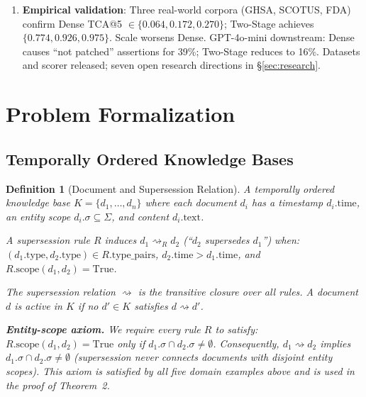 \documentclass[11pt]{article}
\newtheorem{definition}{Definition}
\begin{document}
\begin{enumerate}
  \item \textbf{Empirical validation}: Three real-world corpora (GHSA, SCOTUS, FDA) confirm Dense TCA@5 $\in \{0.064, 0.172, 0.270\}$; Two-Stage achieves $\{0.774, 0.926, 0.975\}$. Scale worsens Dense. GPT-4o-mini downstream: Dense causes ``not patched'' assertions for 39\%; Two-Stage reduces to 16\%. Datasets and scorer released; seven open research directions in \S\ref{sec:research}.
\end{enumerate}

\section{Problem Formalization}
\label{sec:problem}

\subsection{Temporally Ordered Knowledge Bases}

\begin{definition}[Document and Supersession Relation]
A \emph{temporally ordered knowledge base} $K = \{d_1, \ldots, d_n\}$ where each document $d_i$ has a timestamp $d_i.\text{time}$, an entity scope $d_i.\sigma \subseteq \Sigma$, and content $d_i.\text{text}$.

A \emph{supersession rule} $R$ induces $d_1 \rightsquigarrow_R d_2$ (``$d_2$ supersedes $d_1$'') when:
$(d_1.\text{type}, d_2.\text{type}) \in R.\text{type\_pairs}$,
$d_2.\text{time} > d_1.\text{time}$, and
$R.\text{scope}(d_1, d_2) = \text{True}$.

The supersession relation $\rightsquigarrow$ is the transitive closure over all rules. A document $d$ is \emph{active} in $K$ if no $d' \in K$ satisfies $d \rightsquigarrow d'$.

\textbf{Entity-scope axiom.} We require every rule $R$ to satisfy: $R.\text{scope}(d_1,d_2) = \text{True}$ only if $d_1.\sigma \cap d_2.\sigma \neq \emptyset$. Consequently, $d_1 \rightsquigarrow d_2$ implies $d_1.\sigma \cap d_2.\sigma \neq \emptyset$ (supersession never connects documents with disjoint entity scopes). This axiom is satisfied by all five domain examples above and is used in the proof of Theorem~2.
\end{definition}
\end{document}
